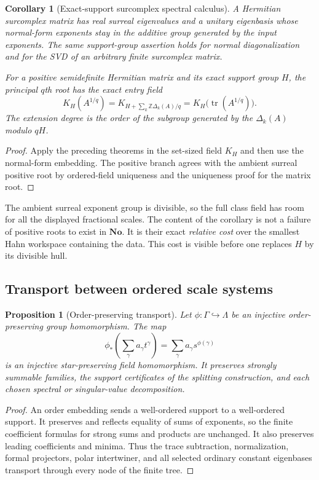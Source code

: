\documentclass[11pt,letterpaper]{article}
\numberwithin{equation}{section}
\newtheorem{proposition}[theorem]{Proposition}
\newtheorem{corollary}[theorem]{Corollary}
\theoremstyle{definition}
\theoremstyle{remark}
\newcommand{\Z}{\mathbb Z}
\newcommand{\No}{\mathbf{No}}
\newcommand{\tr}{\operatorname{tr}}
\begin{document}
\begin{corollary}[Exact-support surcomplex spectral calculus]\label{cor:surcomplex}
A Hermitian surcomplex matrix has real surreal eigenvalues and a unitary
eigenbasis whose normal-form exponents stay in the additive group generated
by the input exponents. The same support-group assertion holds for normal
diagonalization and for the SVD of an arbitrary finite surcomplex matrix.

For a positive semidefinite Hermitian matrix and its exact support group $H$,
the principal $q$th root has the exact entry field
\[
 K_H(A^{1/q})
   =K_{H+\sum_k\Z\Delta_k(A)/q}
   =K_H\bigl(\tr(A^{1/q})\bigr).
\]
The extension degree is the order of the subgroup generated by the
$\Delta_k(A)$ modulo $qH$.
\end{corollary}
\begin{proof}
Apply the preceding theorems in the set-sized field $K_H$ and then use the
normal-form embedding. The positive branch agrees with the ambient surreal
positive root by ordered-field uniqueness and the uniqueness proof for the
matrix root.
\end{proof}

The ambient surreal exponent group is divisible, so the full class field has
room for all the displayed fractional scales. The content of the corollary
is not a failure of positive roots to exist in $\No$. It is their exact
\emph{relative cost} over the smallest Hahn workspace containing the data.
This cost is visible before one replaces $H$ by its divisible hull.

\subsection{Transport between ordered scale systems}

\begin{proposition}[Order-preserving transport]\label{prop:transport}
Let $\phi:\Gamma\hookrightarrow\Lambda$ be an injective order-preserving
group homomorphism. The map
\[
 \phi_*\left(\sum_\gamma a_\gamma t^\gamma\right)
       =\sum_\gamma a_\gamma s^{\phi(\gamma)}
\]
is an injective star-preserving field homomorphism. It preserves strongly
summable families, the support certificates of the splitting construction,
and each chosen spectral or singular-value decomposition.
\end{proposition}
\begin{proof}
An order embedding sends a well-ordered support to a well-ordered support.
It preserves and reflects equality of sums of exponents, so the finite
coefficient formulas for strong sums and products are unchanged. It also
preserves leading coefficients and minima. Thus the trace subtraction,
normalization, formal projectors, polar intertwiner, and all selected ordinary
constant eigenbases transport through every node of the finite tree.
\end{proof}
\end{document}
